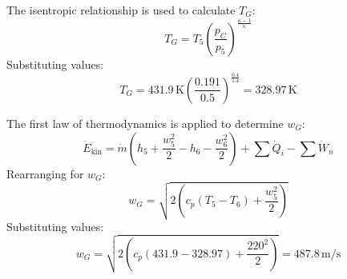 The isentropic relationship is used to calculate \( T_G \):  
\[
T_G = T_5 \left( \frac{p_C}{p_5} \right)^{\frac{\kappa - 1}{\kappa}}
\]  
Substituting values:  
\[
T_G = 431.9 \, \text{K} \left( \frac{0.191}{0.5} \right)^{\frac{0.4}{1.4}} = 328.97 \, \text{K}
\]  

The first law of thermodynamics is applied to determine \( w_G \):  
\[
\dot{E}_{\text{kin}} = \dot{m} \left( h_5 + \frac{w_5^2}{2} - h_6 - \frac{w_6^2}{2} \right) + \sum \dot{Q}_i - \sum \dot{W}_n
\]  
Rearranging for \( w_G \):  
\[
w_G = \sqrt{2 \left( c_p (T_5 - T_6) + \frac{w_5^2}{2} \right)}
\]  
Substituting values:  
\[
w_G = \sqrt{2 \left( c_p (431.9 - 328.97) + \frac{220^2}{2} \right)} = 487.8 \, \text{m/s}
\]